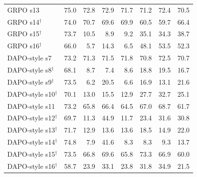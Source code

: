 \documentclass[11pt]{article}
\begin{document}
\begin{table}[p]
{\begin{tabular}{lrrrrrrr}
GRPO s13 & 75.0 & 72.8 & 72.9 & 71.7 & 71.2 & 72.4 & 70.5 \\
GRPO s14$^\dagger$ & 74.0 & 70.7 & 69.6 & 69.9 & 60.5 & 59.7 & 66.4 \\
GRPO s15$^\dagger$ & 73.7 & 10.5 & 8.9 & 9.2 & 35.1 & 34.3 & 38.7 \\
GRPO s16$^\dagger$ & 66.0 & 5.7 & 14.3 & 6.5 & 48.1 & 53.5 & 52.3 \\
\midrule
DAPO-style s7 & 73.2 & 71.3 & 71.5 & 71.8 & 70.8 & 72.5 & 70.7 \\
DAPO-style s8$^\dagger$ & 68.1 & 8.7 & 7.4 & 8.6 & 18.8 & 19.5 & 16.7 \\
DAPO-style s9$^\dagger$ & 73.5 & 6.2 & 20.5 & 6.6 & 16.9 & 13.1 & 21.6 \\
DAPO-style s10$^\dagger$ & 70.1 & 13.0 & 15.5 & 12.9 & 27.7 & 32.7 & 25.1 \\
DAPO-style s11 & 73.2 & 65.8 & 66.4 & 64.5 & 67.0 & 68.7 & 61.7 \\
DAPO-style s12$^\dagger$ & 69.7 & 11.3 & 44.9 & 11.7 & 23.4 & 31.6 & 30.8 \\
DAPO-style s13$^\dagger$ & 71.7 & 12.9 & 13.6 & 13.6 & 18.5 & 14.9 & 22.0 \\
DAPO-style s14$^\dagger$ & 74.8 & 7.9 & 41.6 & 8.3 & 8.3 & 9.3 & 13.7 \\
DAPO-style s15$^\dagger$ & 73.5 & 66.8 & 69.6 & 65.8 & 73.3 & 66.9 & 60.0 \\
DAPO-style s16$^\dagger$ & 58.7 & 23.9 & 33.1 & 23.8 & 31.8 & 34.9 & 21.5 \\
\bottomrule
\end{tabular}}
\end{table}
\end{document}
